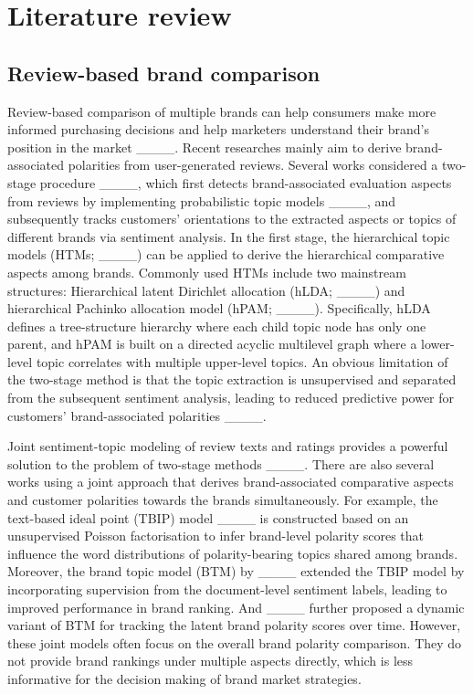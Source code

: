 \section{Literature review}
\label{literature}
\subsection{Review-based brand comparison}
Review-based comparison of multiple brands can help consumers make more informed purchasing decisions and help marketers understand their brand's position in the market ____. 
Recent researches mainly aim to derive brand-associated polarities from user-generated reviews. 
Several works considered a two-stage procedure ____, which first detects brand-associated evaluation aspects from reviews by implementing probabilistic topic models ____, and subsequently tracks customers' orientations to the extracted aspects or topics of different brands via sentiment analysis. 
In the first stage, the hierarchical topic models (HTMs; ____) can be applied to derive the hierarchical comparative aspects among brands.
Commonly used HTMs include two mainstream structures: Hierarchical latent Dirichlet allocation (hLDA; ____) and hierarchical Pachinko allocation model (hPAM; ____). 
Specifically, hLDA defines a tree-structure hierarchy where each child topic node has only one parent, and hPAM is built on a directed acyclic multilevel graph where a lower-level topic correlates with multiple upper-level topics.
An obvious limitation of the two-stage method is that the topic extraction is unsupervised and separated from the subsequent sentiment analysis, leading to reduced predictive power for customers' brand-associated polarities ____.

Joint sentiment-topic modeling of review texts and ratings provides a powerful solution to the problem of two-stage methods ____.
There are also several works using a joint approach that derives brand-associated comparative aspects and customer polarities towards the brands simultaneously. 
For example, the text-based ideal point (TBIP) model ____ is constructed based on an unsupervised Poisson factorisation  to infer brand-level polarity scores that influence the word distributions of polarity-bearing topics shared among brands. Moreover, the brand topic model (BTM) by ____ extended the TBIP model by incorporating supervision from the document-level sentiment labels, leading to improved performance in brand ranking. And ____ further proposed a dynamic variant of BTM for tracking the latent brand polarity scores over time. 
However, these joint models often focus on the overall brand polarity comparison. They do not provide brand rankings under multiple aspects directly, which is less informative for the decision making of brand market strategies.




